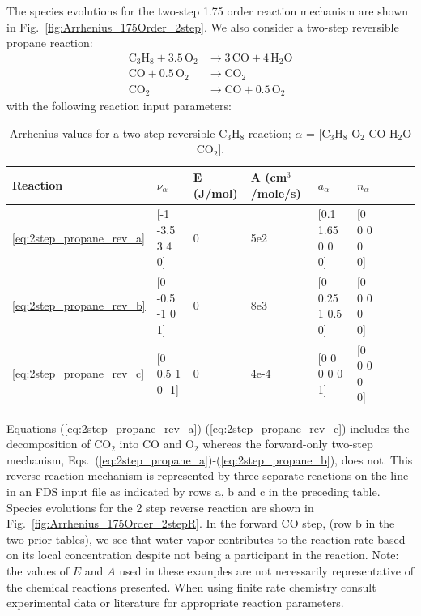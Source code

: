 \documentclass[11pt]{book}
\begin{document}
The species evolutions for the two-step 1.75 order reaction mechanism are shown in Fig.~\ref{fig:Arrhenius_175Order_2step}. We also consider a two-step reversible propane reaction:
\begin{subequations}
\begin{align}
\label{eq:2step_propane_rev_a}
\mathrm{C_3H_8+3.5 \, O_2} &\rightarrow \mathrm{3 \, CO+4 \, H_2O} \\
\label{eq:2step_propane_rev_b}
\mathrm{CO + 0.5 \, O_2} &\rightarrow \mathrm{CO_2} \\
\label{eq:2step_propane_rev_c}
\mathrm{CO_2} &\rightarrow \mathrm{CO + 0.5 \, O_2}
\end{align}
\end{subequations}
with the following reaction input parameters:
\begin{table}[ht]
\begin{center}
\caption[Arrhenius values for a two-step reversible C$_3$H$_8$ reaction]{Arrhenius values for a two-step reversible C$_3$H$_8$ reaction; $\alpha$ = [$\mathrm{C_3H_8}$ $\mathrm{O_2}$ $\mathrm{CO}$ $\mathrm{H_2O}$ $\mathrm{CO_2}$].}
\label{two_step_rev_c3h8}
\begin{tabular}{|l|l|l|l|l|l|l|l|l|}
\hline Reaction & $\nu_{\alpha}$ & E (J/mol) & A (cm$^3$/mole/s) & $a_{\alpha}$ & $n_{\alpha}$  \\ \hline \hline
\ref{eq:2step_propane_rev_a} & [-1 -3.5 3 4 0] & 0 & 5e2  & [0.1 1.65 0 0 0] & [0 0 0 0 0] \\ \hline
\ref{eq:2step_propane_rev_b} & [0 -0.5 -1 0 1] & 0 & 8e3  & [0 0.25 1 0.5 0] & [0 0 0 0 0] \\ \hline
\ref{eq:2step_propane_rev_c} & [0 0.5 1 0 -1]  & 0 & 4e-4 & [0 0 0 0 0 1]    & [0 0 0 0 0] \\ \hline
\end{tabular}
\end{center}
\end{table}
Equations (\ref{eq:2step_propane_rev_a})-(\ref{eq:2step_propane_rev_c}) includes the decomposition of $\mathrm{CO_2}$ into $\mathrm{CO}$ and $\mathrm{O_2}$ whereas the forward-only two-step mechanism, Eqs.~(\ref{eq:2step_propane_a})-(\ref{eq:2step_propane_b}), does not. This reverse reaction mechanism is represented by three separate reactions on the  line in an FDS input file as indicated by rows $\mathrm{a}$, $\mathrm{b}$ and $\mathrm{c}$ in the preceding table. Species evolutions for the 2 step reverse reaction are shown in Fig.~\ref{fig:Arrhenius_175Order_2stepR}. In the forward CO step, (row $\mathrm{b}$ in the two prior tables), we see that water vapor contributes to the reaction rate based on its local concentration despite not being a participant in the reaction.
\vskip8pt
Note: the values of $E$ and $A$ used in these examples are not necessarily representative of the chemical reactions presented. When using finite rate chemistry consult experimental data or literature for appropriate reaction parameters.
\end{document}
